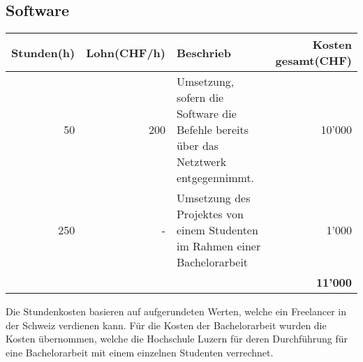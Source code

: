 \subsection{Software}
\begin{tabularx}{\textwidth}{|r|r|X|r|}
	\hline
	\textbf{Stunden(h)} & \textbf{Lohn(CHF/h)} & \textbf{Beschrieb} & \textbf{Kosten gesamt(CHF)} \\
	\hline
	50 & 200 & Umsetzung, sofern die Software die Befehle bereits über das Netztwerk entgegennimmt. & 10'000 \\
	\hline
	250 & - & Umsetzung des Projektes von einem Studenten im Rahmen einer Bachelorarbeit & 1'000 \\
	& & & \textbf{11'000} \\
	\hline
\end{tabularx}

Die Stundenkosten basieren auf aufgerundeten Werten, welche ein Freelancer in der Schweiz verdienen kann.
Für die Kosten der Bachelorarbeit wurden die Kosten übernommen, welche die Hochschule Luzern für deren Durchführung für eine Bachelorarbeit mit einem einzelnen Studenten
verrechnet.

